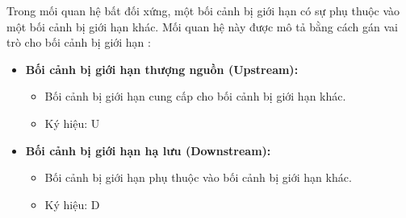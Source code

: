 

Trong mối quan hệ bất đối xứng, một bối cảnh bị giới hạn có sự phụ thuộc vào một bối cảnh bị giới hạn khác. Mối quan hệ này được mô tả bằng cách gán vai trò cho bối cảnh bị giới hạn :

\begin{itemize}

    \item \textbf{Bối cảnh bị giới hạn thượng nguồn (Upstream):}

          \begin{itemize}

              \item Bối cảnh bị giới hạn cung cấp cho bối cảnh bị giới hạn khác.

              \item Ký hiệu: U

          \end{itemize}

    \item \textbf{Bối cảnh bị giới hạn hạ lưu (Downstream):}

          \begin{itemize}

              \item Bối cảnh bị giới hạn phụ thuộc vào bối cảnh bị giới hạn khác.

              \item Ký hiệu: D

          \end{itemize}

\end{itemize}

